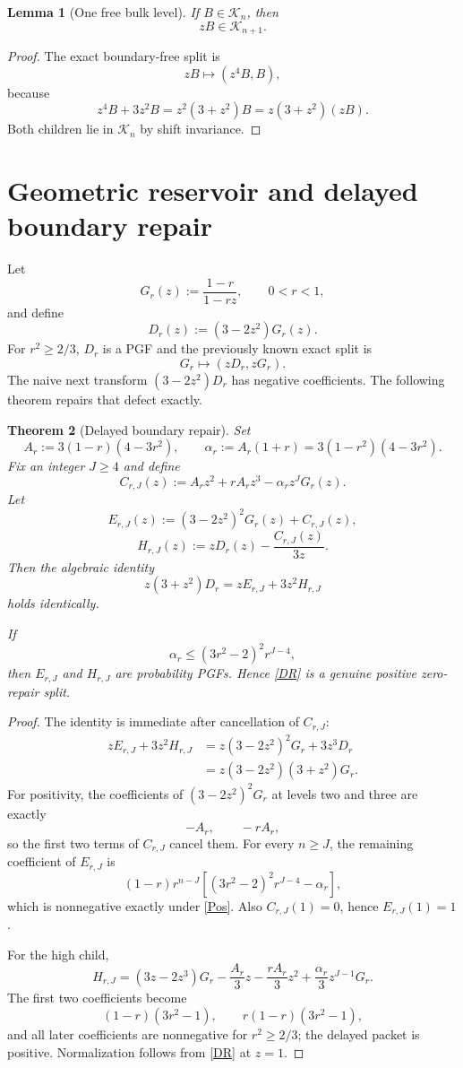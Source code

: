 \documentclass[11pt,a4paper]{article}
\newtheorem{theorem}{Theorem}[section]
\newtheorem{lemma}[theorem]{Lemma}
\newcommand{\cK}{\mathcal K}
\newcommand{\1}{\mathbf 1}
\begin{document}
\begin{lemma}[One free bulk level]
If \(B\in\cK_n\), then
\[
\boxed{zB\in\cK_{n+1}.}
\]
\end{lemma}

\begin{proof}
The exact boundary-free split is
\[
zB\longmapsto(z^4B,B),
\]
because
\[
z^4B+3z^2B=z^2(3+z^2)B=z(3+z^2)(zB).
\]
Both children lie in \(\cK_n\) by shift invariance.
\end{proof}

\section{Geometric reservoir and delayed boundary repair}

Let
\[
G_r(z):=\frac{1-r}{1-rz},
\qquad 0<r<1,
\]
and define
\[
D_r(z):=(3-2z^2)G_r(z).
\]
For \(r^2\ge2/3\), \(D_r\) is a PGF and the previously known exact split is
\[
\boxed{
G_r\longmapsto(zD_r,zG_r).
}
\tag{G1}
\]
The naive next transform \((3-2z^2)D_r\) has negative coefficients.  The
following theorem repairs that defect exactly.

\begin{theorem}[Delayed boundary repair]
Set
\[
A_r:=3(1-r)(4-3r^2),
\qquad
\alpha_r:=A_r(1+r)=3(1-r^2)(4-3r^2).
\]
Fix an integer \(J\ge4\) and define
\[
C_{r,J}(z)
:=
A_rz^2+rA_rz^3-\alpha_r z^JG_r(z).
\]
Let
\[
E_{r,J}(z)
:=
(3-2z^2)^2G_r(z)+C_{r,J}(z),
\]
\[
H_{r,J}(z)
:=
zD_r(z)-\frac{C_{r,J}(z)}{3z}.
\]
Then the algebraic identity
\[
\boxed{
z(3+z^2)D_r
=
zE_{r,J}+3z^2H_{r,J}
}
\tag{DR}
\]
holds identically.

If
\[
\boxed{
\alpha_r
\le
(3r^2-2)^2r^{J-4},
}
\tag{Pos}
\]
then \(E_{r,J}\) and \(H_{r,J}\) are probability PGFs.  Hence \eqref{DR}
is a genuine positive zero-repair split.
\end{theorem}

\begin{proof}
The identity is immediate after cancellation of \(C_{r,J}\):
\[
\begin{aligned}
zE_{r,J}+3z^2H_{r,J}
&=z(3-2z^2)^2G_r+3z^3D_r\\
&=z(3-2z^2)(3+z^2)G_r.
\end{aligned}
\]
For positivity, the coefficients of \((3-2z^2)^2G_r\) at levels two and
three are exactly
\[
-A_r,
\qquad
-rA_r,
\]
so the first two terms of \(C_{r,J}\) cancel them.  For every \(n\ge J\), the
remaining coefficient of \(E_{r,J}\) is
\[
(1-r)r^{n-J}
\left[
(3r^2-2)^2r^{J-4}-\alpha_r
\right],
\]
which is nonnegative exactly under \eqref{Pos}.  Also
\(C_{r,J}(1)=0\), hence \(E_{r,J}(1)=1\).

For the high child,
\[
H_{r,J}
=(3z-2z^3)G_r
-\frac{A_r}{3}z
-\frac{rA_r}{3}z^2
+\frac{\alpha_r}{3}z^{J-1}G_r.
\]
The first two coefficients become
\[
(1-r)(3r^2-1),
\qquad
r(1-r)(3r^2-1),
\]
and all later coefficients are nonnegative for \(r^2\ge2/3\); the delayed
packet is positive.  Normalization follows from \eqref{DR} at \(z=1\).
\end{proof}
\end{document}
